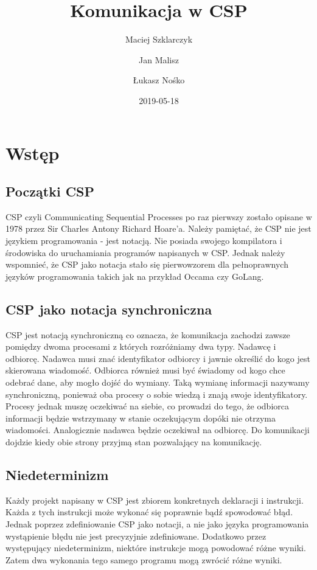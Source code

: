 \documentclass[a4paper]{report}
\title{Komunikacja w CSP}
\author{
Maciej Szklarczyk
\and
Jan Malisz
\and
Łukasz Nośko
}
\date{2019-05-18}
\begin{document}
  \maketitle
  \thispagestyle{empty}
  \newpage

  \tableofcontents
  \newpage

  \chapter{Wstęp}

  \section{Początki CSP}
  CSP czyli Communicating Sequential Processes po raz pierwszy zostało opisane w 1978 przez Sir Charles Antony Richard Hoare’a.
  Należy pamiętać, że CSP nie jest językiem programowania - jest notacją.
  Nie posiada swojego kompilatora i środowiska do uruchamiania programów napisanych w CSP.
  Jednak należy wspomnieć, że CSP jako notacja stało się pierwowzorem dla pełnoprawnych języków programowania takich jak na przykład Occama czy GoLang.

  \section{CSP jako notacja synchroniczna}
  CSP jest notacją synchroniczną co oznacza, że komunikacja zachodzi zawsze pomiędzy dwoma procesami z których rozróżniamy dwa typy.
  Nadawcę i odbiorcę.
  Nadawca musi znać identyfikator odbiorcy i jawnie określić do kogo jest skierowana wiadomość.
  Odbiorca również musi być świadomy od kogo chce odebrać dane, aby mogło dojść do wymiany.
  Taką wymianę informacji nazywamy synchroniczną, ponieważ oba procesy o sobie wiedzą i znają swoje identyfikatory.
  Procesy jednak muszę oczekiwać na siebie, co prowadzi do tego, że odbiorca informacji będzie wstrzymany w stanie oczekującym dopóki nie otrzyma wiadomości.
  Analogicznie nadawca będzie oczekiwał na odbiorcę.
  Do komunikacji dojdzie kiedy obie strony przyjmą stan pozwalający na komunikację.

  \section{Niedeterminizm}
  Każdy projekt napisany w CSP jest zbiorem konkretnych deklaracji i instrukcji.
  Każda z tych instrukcji może wykonać się poprawnie bądź spowodować błąd.
  Jednak poprzez zdefiniowanie CSP jako notacji, a nie jako języka programowania wystąpienie błędu nie jest precyzyjnie zdefiniowane.
  Dodatkowo przez występujący niedeterminizm, niektóre instrukcje mogą powodować różne wyniki.
  Zatem dwa wykonania tego samego programu mogą zwrócić różne wyniki.
\end{document}
